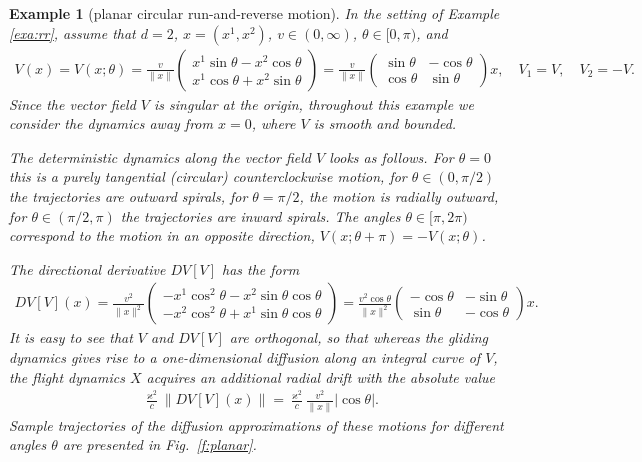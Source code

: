\documentclass[10pt]{article}
\newcommand{\1}{1\!\!\!\;{\rm I}}
\theoremstyle{plain}
\newtheorem{exa}[thm]{Example}
\theoremstyle{definition}
\newcommand{\ba}{\begin{equation}\begin{aligned}}
\newcommand{\ea}{\end{aligned}\end{equation}}
\numberwithin{equation}{section}
\begin{document}
\begin{exa}[planar circular run-and-reverse motion]
In the setting of Example \ref{exa:rr},
assume that $d=2$, $x=(x^1,x^2)$, $v\in (0,\infty)$, $\theta\in [0,\pi)$, and
\ba
V(x)=V(x;\theta)=\frac{v}{\|x\|}\begin{pmatrix}
                                  x^1\sin\theta-x^2 \cos \theta\\
                                  x^1 \cos \theta + x^2\sin\theta
                                 \end{pmatrix}
= \frac{v}{\|x\|}\begin{pmatrix}
                                  \sin\theta &-\cos \theta\\
                                  \cos \theta  &\sin\theta
                                 \end{pmatrix}         x
                                 ,\quad
V_1=V,\quad V_2=-V.
\ea
Since the vector field $V$ is singular at the origin, throughout this example we consider
the dynamics away from $x=0$, where $V$ is smooth and bounded.

The deterministic dynamics along the vector field $V$ looks as follows.
For $\theta=0$ this is a purely tangential (circular) counterclockwise motion,
for $\theta\in (0,\pi/2)$ the trajectories are outward spirals, for  $\theta=\pi/2$, the motion is radially outward,
for $\theta\in (\pi/2,\pi)$ the trajectories are inward spirals. The angles $\theta\in [\pi,2\pi)$ correspond to the
motion in an opposite direction, $V(x;\theta+\pi)=-V(x;\theta)$.


The directional derivative $DV[V]$ has the form
\ba
DV[V](x)=\frac{v^2}{\|x\|^2}\begin{pmatrix}
                                  -x^1\cos^2\theta -x^2 \sin \theta\cos \theta\\
                                  - x^2 \cos^2 \theta + x^1 \sin \theta \cos \theta
                                 \end{pmatrix}
=\frac{v^2\cos\theta}{\|x\|^2}\begin{pmatrix}
                                  -\cos\theta & -\sin \theta \\
                                  \sin \theta &- \cos \theta
                                 \end{pmatrix}x.
\ea
It is easy to see that $V$ and $DV[V]$ are orthogonal, so that whereas the gliding dynamics gives rise to
a one-dimensional diffusion along an integral curve of $V$, the flight dynamics $X$ acquires an additional radial drift
with the absolute value
\ba
\frac{\varkappa^2}{c} \|DV[V](x)\|= \frac{\varkappa^2}{c} \frac{v^2}{\|x\|}|\cos\theta|.
\ea
Sample trajectories of the diffusion approximations of these motions for different angles $\theta$ are presented in Fig.~\ref{f:planar}.


\end{exa}
\end{document}

